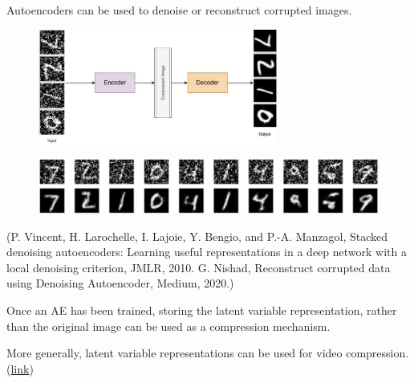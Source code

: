 \begin{concept}[9.4][Applications of AE]
    Autoencoders can be used to denoise or reconstruct corrupted images.

    \begin{figure}[H]
        \centering
        \includegraphics[width=0.7\textwidth]{.././assets/9.2.png}
    \end{figure}

    \begin{figure}[H]
        \centering
        \includegraphics[width=1.0\textwidth]{.././assets/9.3.png}
    \end{figure}

    (P. Vincent, H. Larochelle, I. Lajoie, Y. Bengio, and P.-A. Manzagol, Stacked denoising autoencoders: Learning useful representations in a deep network with a local denoising criterion, JMLR, 2010.
    G. Nishad, Reconstruct corrupted data using Denoising Autoencoder, Medium, 2020.)
\end{concept}

\begin{concept}[9.5][Applications of AE]
    Once an AE has been trained, storing the latent variable representation, rather than the original image can be used as a compression mechanism.

    More generally, latent variable representations can be used for video compression.
    (\href{https://youtu.be/NqmMnjJ6GEg}{link})
\end{concept}

